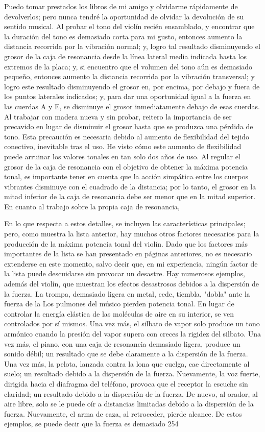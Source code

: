 Puedo tomar prestados los libros de mi amigo y olvidarme rápidamente de devolverlos; pero nunca tendré la oportunidad de olvidar la devolución de su sentido musical. Al probar el tono del violín recién ensamblado, y encontrar que la duración del tono es demasiado corta para mi gusto, entonces aumento la distancia recorrida por la vibración normal; y, logro tal resultado disminuyendo el grosor de la caja de resonancia desde la línea lateral media indicada hasta los extremos de la placa; y, si encuentro que el volumen del tono aún es demasiado pequeño, entonces aumento la distancia recorrida por la vibración transversal; y logro este resultado disminuyendo el grosor en, por encima, por debajo y fuera de los puntos laterales indicados; y, para dar una oportunidad igual a la fuerza en las cuerdas A y E, se disminuye el grosor inmediatamente debajo de esas cuerdas.
Al trabajar con madera nueva y sin probar, reitero la importancia de ser precavido en lugar de disminuir el grosor hasta que se produzca una pérdida de tono. Esta precaución es necesaria debido al aumento de flexibilidad del tejido conectivo, inevitable tras el uso. He visto cómo este aumento de flexibilidad puede arruinar los valores tonales en tan solo dos años de uso. Al regular el grosor de la caja de resonancia con el objetivo de obtener la máxima potencia tonal, es importante tener en cuenta que la acción simpática entre los cuerpos vibrantes disminuye con el cuadrado de la distancia; por lo tanto, el grosor en la mitad inferior de la caja de resonancia debe ser menor que en la mitad superior. En cuanto al trabajo sobre la propia caja de resonancia,

En lo que respecta a estos detalles, se incluyen las características principales; pero, como muestra la lista anterior, hay muchos otros factores necesarios para la producción de la máxima potencia tonal del violín. Dado que los factores más importantes de la lista se han presentado en páginas anteriores, no es necesario extenderse en este momento, salvo decir que, en mi experiencia, ningún factor de la lista puede descuidarse sin provocar un desastre. Hay numerosos ejemplos, además del violín, que muestran los efectos desastrosos debidos a la dispersión de la fuerza. La trompa, demasiado ligera en metal, cede, tiembla, "dobla" ante la fuerza de la
Los pulmones del músico pierden potencia tonal. En lugar de controlar la energía elástica de las moléculas de aire en su interior, se ven controlados por sí mismos.
Una vez más, el silbato de vapor solo produce un tono armónico cuando la presión del vapor supera con creces la rigidez del silbato.
Una vez más, el piano, con una caja de resonancia demasiado ligera, produce un sonido débil; un resultado que se debe claramente a la dispersión de la fuerza.
Una vez más, la pelota, lanzada contra la lona que cuelga, cae directamente al suelo; un resultado debido a la dispersión de la fuerza.
Nuevamente, la voz fuerte, dirigida hacia el diafragma del teléfono, provoca que el receptor la escuche sin claridad; un resultado debido a la dispersión de la fuerza.
De nuevo, al orador, al aire libre, solo se le puede oír a distancias limitadas debido a la dispersión de la fuerza.
Nuevamente, el arma de caza, al retroceder, pierde alcance. De estos ejemplos, se puede decir que la fuerza es demasiado
254

